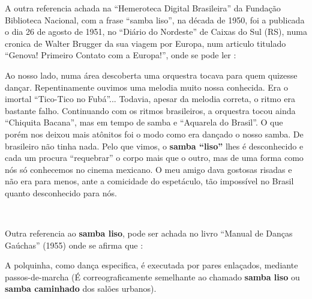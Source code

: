 A outra referencia achada na ``Hemeroteca Digital Brasileira'' da Fundação Biblioteca Nacional,
com a frase ``samba liso'', na década de 1950, foi a publicada o dia 26 de agosto de 1951,
no ``Diário do Nordeste'' de Caixas do Sul (RS), numa cronica de Walter Brugger da sua viagem por Europa,
num articulo titulado ``Genova! Primeiro Contato com a Europa!'',
onde se pode ler \cite[pp. 10]{nordestesambalisocronica}:
\begin{citando}
Ao nosso lado, numa área 
descoberta uma orquestra tocava para
quem quizesse dançar.
Repentinamente ouvimos uma melodia muito
nossa conhecida. Era o imortal ``Tico-Tico no Fubá''... Todavia,
apesar da melodia correta, o ritmo
era bastante falho. Continuando 
com os ritmos brasileiros, a orquestra 
tocou ainda ``Chiquita Bacana'',
mas em tempo de samba e ``Aquarela do Brasil''.
O que porém nos 
deixou mais atônitos foi o modo como 
era dançado o nosso samba. De 
brasileiro não tinha nada. Pelo que 
vimos, o \textbf{samba ``liso''} lhes é desconhecido 
e cada um procura ``requebrar'' o corpo mais que o outro,
mas de uma forma como nós só 
conhecemos no cinema mexicano. 
O meu amigo dava gostosas risadas e não era para menos,
ante a comicidade do espetáculo, tão 
impossível no Brasil quanto desconhecido para nós.
\end{citando}~\\



Outra referencia ao \textbf{samba liso}, pode ser achada no livro ``Manual de Danças Gaúchas'' (1955)
onde se afirma que \cite[pp. 77]{cortesmanual}: 
\begin{citando}
A polquinha, como dança especifica, é executada por pares enlaçados,
mediante passos-de-marcha (É correograficamente  semelhante ao chamado 
\textbf{samba liso} ou \textbf{samba caminhado} dos salões urbanos).
\end{citando}~\\


